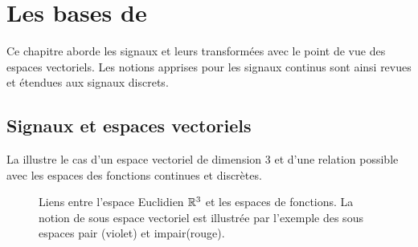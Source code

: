 \chapter{Les bases de \Fourier}
\label{chap:fourier}
Ce chapitre aborde les signaux et leurs transformées avec le point de
vue des espaces vectoriels. Les notions apprises pour les signaux
continus sont ainsi revues et étendues aux signaux discrets.



\section{Signaux et espaces vectoriels}
\label{VEC}
La  illustre le cas d'un espace
vectoriel de dimension 3 et d'une relation possible avec les espaces
des fonctions continues et discrètes.


\begin{figure}[htbp]
  \centering {}
  \caption{Liens entre l'espace Euclidien $\mathbb{R}^3$ et les espaces de
    fonctions. La notion de sous espace vectoriel est illustrée par
    l'exemple des sous espaces pair (violet) et impair(rouge).}
  \label{fig:espaces_vectoriels}
\end{figure}



